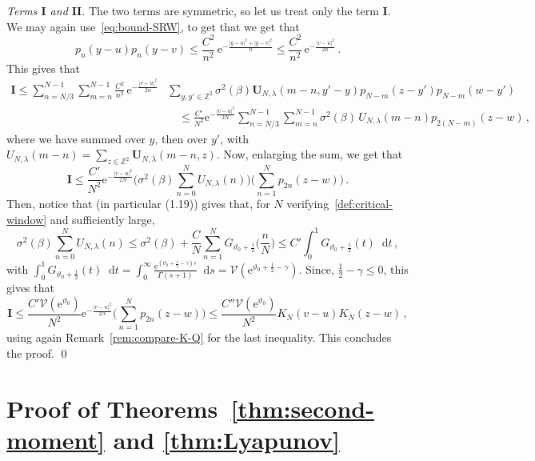 \documentclass[11pt]{amsart}
\numberwithin{equation}{section}
\newcommand*{\numberset}{\mathbb}
\newcommand*{\Z}{\numberset{Z}}
\newcommand{\e}{\mathrm{e}}
\newcommand*\dd{\mathop{}\!\mathrm{d}}
\theoremstyle{plain}
\theoremstyle{definition}
\theoremstyle{remark}
\begin{document}
\smallskip
\textit{Terms \(\mathbf{I}\) and \(\mathbf{II}\). }
The two terms are symmetric, so let us treat only the term \(\mathbf{I}\). 
We may again use~\eqref{eq:bound-SRW}, to get that 
we get that
\[
p_n(y-u)p_n(y-v) \leq  \frac{C^2}{n^2}\, \e^{- \frac{|y-u|^2+|y-v|^2}{n}} \leq  \frac{C^2}{n^2}\, \e^{- \frac{|v-u|^2}{2 n}} \,.
\]
This gives that
\[
\begin{split}
   \mathbf{I} \leq  \sum_{n=N/3 }^{N-1} \sum_{m=n}^{N-1} \frac{C^2}{n^2}\, \e^{- \frac{|v-u|^2}{2 n}} & \sum_{y,y'\in \Z^2}  \sigma^2(\beta) \mathbf{U}_{N,\lambda} (m-n,y'-y) p_{N-m}(z-y')p_{N-m}(w-y') \\  
   & \quad \leq \frac{C'}{N^2} \e^{- \frac{|v-u|^2}{2 N}} \sum_{n=N/3 }^{N-1} \sum_{m=n}^{N-1} \sigma^2(\beta)\, U_{N,\lambda}(m-n) p_{2(N-m)}(z-w) \,,
\end{split}
\]
where we have summed over \(y\), then over \(y'\), with \(U_{N,\lambda}(m-n) = \sum_{z\in \Z^2} \mathbf{U}_{N,\lambda} (m-n,z)\).
Now, enlarging the sum, we get that
\[
       \mathbf{I} \leq \frac{C'}{N^2} \e^{- \frac{|v-u|^2}{2 N}} \Big( \sigma^2(\beta)\sum_{n=0}^N U_{N,\lambda}(n)\Big) \Big(  \sum_{n=1}^{N} p_{2n}(z-w)\Big)\,.
\]
Then, notice that \cite[Theorem~1.4]{CSZ19b} (in particular (1.19)) gives that, for \(N\) verifying~\eqref{def:critical-window} and sufficiently large,
\[
\sigma^2(\beta)\sum_{n=0}^N U_{N,\lambda}(n) \leq \sigma^2(\beta)  + \frac{C}{N} \sum_{n=1}^N G_{\vartheta_0+\frac12}\Big(\frac{n}{N}\Big) \leq  C' \int_0^1 G_{\vartheta_0+\frac12}(t)\dd t \,,
\]
with \(\int_0^1 G_{\vartheta_0+\frac12}(t)\dd t = \int_{0}^{\infty} \frac{\e^{(\vartheta_0+\frac12-\gamma)s}}{\Gamma(s+1)} \dd s = \mathcal{V}(\e^{\vartheta_0+\frac12-\gamma})\).
Since, \(\frac12-\gamma\leq 0\), this gives that
\[
 \mathbf{I} \leq \frac{C'\mathcal{V}(\e^{\vartheta_0}) }{N^2} \e^{- \frac{|v-u|^2}{2 N}} \Big( \sum_{n=1}^{N} p_{2n}(z-w)\Big) \leq   \frac{C''\mathcal{V}(\e^{\vartheta_0}) }{N^2}  K_N(v-u)K_N(z-w)\,,
\]
using again Remark~\ref{rem:compare-K-Q} for the last inequality. This concludes the proof.
\qed









\section{Proof of Theorems~\ref{thm:second-moment} and \ref{thm:Lyapunov}}

\label{sec:Lyapunov}
\end{document}

